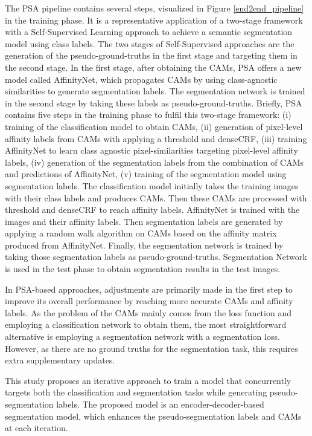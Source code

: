 \documentclass[sn-mathphys]{sn-jnl}
\theoremstyle{thmstyleone}
\theoremstyle{thmstyletwo}\newtheorem{example}{Example}\newtheorem{remark}{Remark}
\theoremstyle{thmstylethree}\newtheorem{definition}{Definition}
\begin{document}
The PSA pipeline contains several steps, visualized in Figure \ref{end2end_pipeline} in the training phase. It is a representative application of a two-stage framework with a Self-Supervised Learning approach to achieve a semantic segmentation model using class labels. The two stages of Self-Supervised approaches are the generation of the pseudo-ground-truths in the first stage and targeting them in the second stage. In the first stage, after obtaining the CAMs, PSA offers a new model called AffinityNet, which propagates CAMs by using class-agnostic similarities to generate segmentation labels. The segmentation network is trained in the second stage by taking these labels as pseudo-ground-truths. Briefly, PSA contains five steps in the training phase to fulfil this two-stage framework: (i) training of the classification model to obtain CAMs, (ii) generation of pixel-level affinity labels from CAMs with applying a threshold and denseCRF, (iii) training AffinityNet to learn class agnostic pixel-similarities targeting pixel-level affinity labels, (iv) generation of the segmentation labels from the combination of CAMs and predictions of AffinityNet, (v) training of the segmentation model using segmentation labels. The classification model initially takes the training images with their class labels and produces CAMs. Then these CAMs are processed with threshold and denseCRF to reach affinity labels. AffinityNet is trained with the images and their affinity labels. Then segmentation labels are generated by applying a random walk algorithm on CAMs based on the affinity matrix produced from AffinityNet. Finally, the segmentation network is trained by taking those segmentation labels as pseudo-ground-truths. Segmentation Network is used in the test phase to obtain segmentation results in the test images.

In PSA-based approaches, adjustments are primarily made in the first step to improve its overall performance by reaching more accurate CAMs and affinity labels. As the problem of the CAMs mainly comes from the loss function and employing a classification network to obtain them, the most straightforward alternative is employing a segmentation network with a segmentation loss. However, as there are no ground truths for the segmentation task, this requires extra supplementary updates. 

This study proposes an iterative approach to train a model that concurrently targets both the classification and segmentation tasks while generating pseudo-segmentation labels. The proposed model is an encoder-decoder-based segmentation model, which enhances the pseudo-segmentation labels and CAMs at each iteration.
\end{document}
